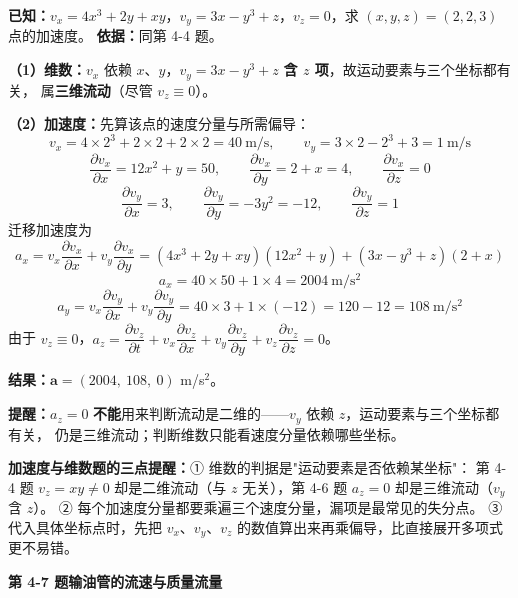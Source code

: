 \begin{jie}
\textbf{已知：}$v_x=4x^3+2y+xy$，$v_y=3x-y^3+z$，$v_z=0$，求 $(x,y,z)=(2,2,3)$ 点的加速度。
\textbf{依据：}同第 4-4 题。

\textbf{（1）维数：}$v_x$ 依赖 $x$、$y$，$v_y=3x-y^3+z$ \textbf{含 $z$ 项}，故运动要素与三个坐标都有关，
属\textbf{三维流动}（尽管 $v_z\equiv0$）。

\textbf{（2）加速度：}先算该点的速度分量与所需偏导：
\[ v_x=4\times2^3+2\times2+2\times2=40\ \mathrm{m/s},\qquad v_y=3\times2-2^3+3=1\ \mathrm{m/s} \]
\[ \frac{\partial v_x}{\partial x}=12x^2+y=50,\qquad \frac{\partial v_x}{\partial y}=2+x=4,\qquad \frac{\partial v_x}{\partial z}=0 \]
\[ \frac{\partial v_y}{\partial x}=3,\qquad \frac{\partial v_y}{\partial y}=-3y^2=-12,\qquad \frac{\partial v_y}{\partial z}=1 \]
迁移加速度为
\[ a_x=v_x\frac{\partial v_x}{\partial x}+v_y\frac{\partial v_x}{\partial y}=(4x^3+2y+xy)(12x^2+y)+(3x-y^3+z)(2+x) \]
\[ a_x=40\times50+1\times4=2004\ \mathrm{m/s^2} \]
\[ a_y=v_x\frac{\partial v_y}{\partial x}+v_y\frac{\partial v_y}{\partial y}=40\times3+1\times(-12)=120-12=108\ \mathrm{m/s^2} \]
由于 $v_z\equiv0$，$a_z=\dfrac{\partial v_z}{\partial t}+v_x\dfrac{\partial v_z}{\partial x}+v_y\dfrac{\partial v_z}{\partial y}+v_z\dfrac{\partial v_z}{\partial z}=0$。

\textbf{结果：}$\bm{a}=(2004,\ 108,\ 0)$ m/s$^2$。

\textbf{提醒：}$a_z=0$ \textbf{不能}用来判断流动是二维的——$v_y$ 依赖 $z$，运动要素与三个坐标都有关，
仍是三维流动；判断维数只能看速度分量依赖哪些坐标。
\end{jie}

\begin{yicuo}
\textbf{加速度与维数题的三点提醒：}① 维数的判据是"运动要素是否依赖某坐标"：
第 4-4 题 $v_z=xy\neq0$ 却是二维流动（与 $z$ 无关），第 4-6 题 $a_z=0$ 却是三维流动（$v_y$ 含 $z$）。
② 每个加速度分量都要乘遍三个速度分量，漏项是最常见的失分点。
③ 代入具体坐标点时，先把 $v_x$、$v_y$、$v_z$ 的数值算出来再乘偏导，比直接展开多项式更不易错。
\end{yicuo}

\noindent\textbf{第 4-7 题\quad 输油管的流速与质量流量}

